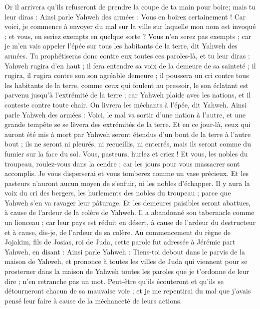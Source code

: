 \begin{multicols}{2}
Or il arrivera qu'ils refuseront de prendre la coupe de ta main pour boire; mais tu leur diras : Ainsi parle Yahweh des armées : Vous en boirez certainement !
Car voici, je commence à envoyer du mal sur la ville sur laquelle mon nom est invoqué ; et vous, en seriez exempts en quelque sorte ? Vous n'en serez pas exempts ; car je m'en vais appeler l'épée sur tous les habitants de la terre, dit Yahweh des armées.
Tu prophétiseras donc contre eux toutes ces paroles-là, et tu leur diras : Yahweh rugira d'en haut ; il fera entendre sa voix de la demeure de sa sainteté ; il rugira, il rugira contre son son agréable demeure ; il poussera un cri  contre tous les habitants de la terre, comme ceux qui foulent au pressoir,
le son éclatant est parvenu jusqu'à l'extrémité de la terre ; car Yahweh plaide avec les nations, et il conteste contre toute chair. On livrera les méchants à l'épée, dit Yahweh.
Ainsi parle Yahweh des armées : Voici, le mal va sortir d'une nation à l'autre, et une grande tempête se se lèvera des extrémités de la terre.
Et en ce jour-là, ceux qui auront été mis à mort par Yahweh seront étendus d'un bout de la terre à l'autre bout ; ils ne seront ni pleurés, ni recueillis, ni enterrés, mais ils seront comme du fumier sur la face du sol.
Vous, pasteurs, hurlez et criez ! Et vous, les nobles du troupeau, roulez-vous dans la cendre ; car les jours pour vous massacrer sont accomplis. Je vous disperserai et vous tomberez comme un vase précieux.
Et les pasteurs n'auront aucun moyen de s'enfuir, ni les nobles d'échapper. 
Il y aura la voix du cri des bergers, les hurlements des nobles du troupeau ; parce que Yahweh s'en va ravager leur pâturage.
Et les demeures paisibles seront abattues, à cause de l'ardeur de la colère de Yahweh.
Il a abandonné son tabernacle comme un lionceau ; car leur pays est réduit en désert, à cause de l'ardeur du destructeur et à cause, dis-je, de l'ardeur de sa colère.
\VerseOne{}Au commencement du règne de Jojakim, fils de Josias, roi de Juda, cette parole fut adressée à Jérémie part Yahweh, en disant :
Ainsi parle Yahweh : Tiens-toi debout dans le parvis de la maison de Yahweh, et prononce à toutes les villes de Juda qui viennent pour se prosterner dans la maison de Yahweh toutes les paroles que je t'ordonne de leur dire ; n'en retranche pas un mot.
Peut-être qu'ils écouteront et qu'ils se détourneront chacun de sa mauvaise voie ; et je me repentirai du mal que j'avais pensé leur faire à cause de la méchanceté de leurs actions.

\end{multicols}

